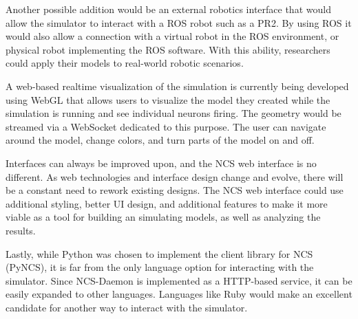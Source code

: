 Another possible addition would be an external robotics interface that would allow the simulator to interact with a ROS robot such as a PR2. By using ROS it would also allow a connection with a virtual robot in the ROS environment, or physical robot implementing the ROS software. With this ability, researchers could apply their models to real-world robotic scenarios.

A web-based realtime visualization of the simulation is currently being developed using WebGL that allows users to visualize the model they created while the simulation is running and see individual neurons firing\cite{cardozadesign}. The geometry would be streamed via a WebSocket dedicated to this purpose. The user can navigate around the model, change colors, and turn parts of the model on and off.

Interfaces can always be improved upon, and the NCS web interface is no different. As web technologies and interface design change and evolve, there will be a constant need to rework existing designs. The NCS web interface could use additional styling, better UI design, and additional features to make it more viable as a tool for building an simulating models, as well as analyzing the results.

Lastly, while Python was chosen to implement the client library for NCS (PyNCS), it is far from the only language option for interacting with the simulator. Since NCS-Daemon is implemented as a HTTP-based service, it can be easily expanded to other languages. Languages like Ruby would make an excellent candidate for another way to interact with the simulator.






